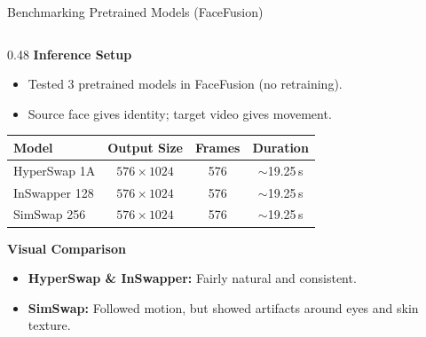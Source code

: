 \begin{frame}{Benchmarking Pretrained Models (FaceFusion)}
    \begin{columns}[c]
        \begin{column}{0.48\textwidth}
            \small
            \textbf{Inference Setup}
            \begin{itemize}
                \footnotesize
                \item Tested 3 pretrained models in FaceFusion (no retraining).
                \item Source face gives identity; target video gives movement.
            \end{itemize}

            \vspace{0.08cm}
            \centering
            \footnotesize
            \begin{tabular}{lccc}
                \toprule
                \textbf{Model} & \textbf{Output Size} & \textbf{Frames} & \textbf{Duration} \\
                \midrule
                HyperSwap 1A & $576 \times 1024$ & 576 & $\sim$19.25\,s \\
                InSwapper 128 & $576 \times 1024$ & 576 & $\sim$19.25\,s \\
                SimSwap 256 & $576 \times 1024$ & 576 & $\sim$19.25\,s \\
                \bottomrule
            \end{tabular}

            \vspace{0.12cm}
            \raggedright
            \small \textbf{Visual Comparison}
            \begin{itemize}
                \footnotesize
                \item \textbf{HyperSwap \& InSwapper:} Fairly natural and consistent.
                \item \textbf{SimSwap:} Followed motion, but showed artifacts around eyes and skin texture.
            \end{itemize}
        \end{column}


\end{columns}
\end{frame}
